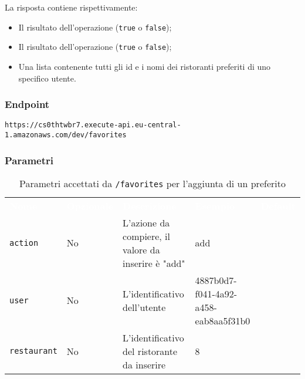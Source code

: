 La risposta contiene rispettivamente:
\begin{itemize}
	\item Il risultato dell'operazione (\texttt{true} o \texttt{false});
    \item Il risultato dell'operazione (\texttt{true} o \texttt{false});
    \item Una lista contenente tutti gli id e i nomi dei ristoranti preferiti di uno specifico utente.
\end{itemize}

\subsubsection{Endpoint}
\texttt{https://cs0thtwbr7.execute-api.eu-central-1.amazonaws.com/dev/favorites}

\subsubsection{Parametri}
\begin{table}[!htbp]
\renewcommand{\arraystretch}{1.5}

\begin{tabular}[t]{ m{}<{\centering}  m{}<{\centering} m{}<{\centering} m{}<{\centering}  m{}<{\centering} }
	\rowcolor{darkblue}
	\textcolor{white}{\textbf{Nome}} &\textcolor{white}{\textbf{Opzionale}} &\textcolor{white}{\textbf{Descrizione}} &\textcolor{white}{\textbf{Esempio}} &\textcolor{white}{\textbf{Default}} \\ 
\texttt{action} & No & L'azione da compiere, il valore da inserire è "add"  & add &  \\
\texttt{user} & No & L'identificativo dell'utente  & 4887b0d7-f041-4a92-a458-eab8aa5f31b0 &  \\
\texttt{restaurant} & No & L'identificativo del ristorante da inserire  & 8 &  \\
\end{tabular}
\caption{Parametri accettati da \texttt{/favorites} per l'aggiunta di un preferito}
\end{table}

